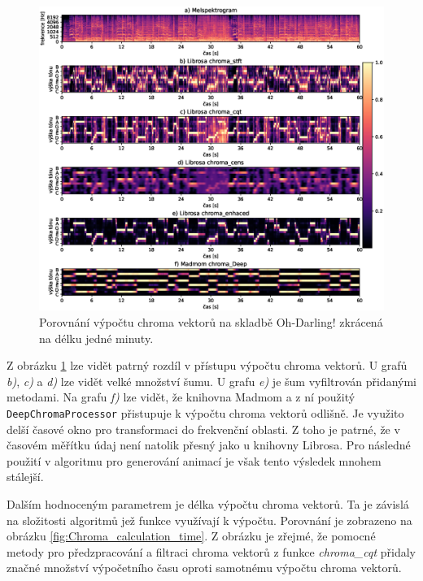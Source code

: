 \begin{figure}[H]
    \centering
    \includegraphics[width = 1\linewidth]{obrazky/Oh-Darling_chroma_analysis_graphs.eps}
    \caption{Porovnání výpočtu chroma vektorů na skladbě Oh-Darling! zkrácená na délku jedné minuty.}
    \label{fig:Chroma_analysis}
\end{figure}

Z obrázku \ref{fig:Chroma_analysis} lze vidět patrný rozdíl v přístupu výpočtu chroma vektorů. U grafů \textit{b)}, \textit{c)} a \textit{d)} lze vidět velké množství šumu. U grafu \textit{e)} je šum vyfiltrován přidanými metodami. Na grafu \textit{f)} lze vidět, že knihovna Madmom a z ní použitý \texttt{DeepChromaProcessor} přistupuje k výpočtu chroma vektorů odlišně. Je využito delší časové okno pro transformaci do frekvenční oblasti. Z toho je patrné, že v časovém měřítku údaj není natolik přesný jako u knihovny Librosa. Pro následné použití v algoritmu pro generování animací je však tento výsledek mnohem stálejší. 

Dalším hodnoceným parametrem je délka výpočtu chroma vektorů. Ta je závislá na složitosti algoritmů jež funkce využívají k výpočtu. Porovnání je zobrazeno na obrázku \ref{fig:Chroma_calculation_time}. Z obrázku je zřejmé, že pomocné metody pro předzpracování a filtraci chroma vektorů z funkce \textit{chroma\_cqt} přidaly značné množství výpočetního času oproti samotnému výpočtu chroma vektorů.

